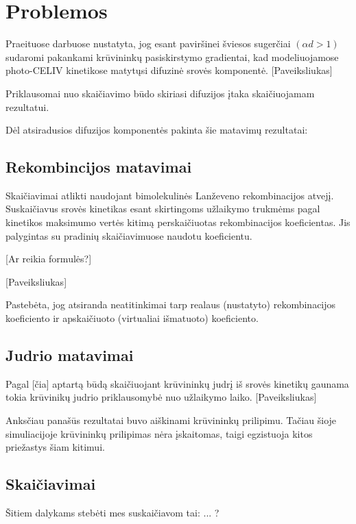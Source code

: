 \section{Problemos}

Praeituose darbuose nustatyta, jog esant paviršinei šviesos sugerčiai $(\alpha d > 1)$ sudaromi pakankami krūvininkų pasiskirstymo gradientai, kad modeliuojamose photo-CELIV kinetikose matytųsi difuzinė srovės komponentė.
[Paveiksliukas]

Priklausomai nuo skaičiavimo būdo skiriasi difuzijos įtaka skaičiuojamam rezultatui.

Dėl atsiradusios difuzijos komponentės pakinta šie matavimų rezultatai:

\subsection{Rekombincijos matavimai}

Skaičiavimai atlikti naudojant bimolekulinės Lanževeno rekombinacijos atvejį. Suskaičiavus srovės kinetikas esant skirtingoms užlaikymo trukmėms pagal kinetikos maksimumo vertės kitimą perskaičiuotas rekombinacijos koeficientas. Jis palygintas su pradinių skaičiavimuose naudotu koeficientu.

[Ar reikia formulės?]

[Paveiksliukas] 

Pastebėta, jog atsiranda neatitinkimai tarp realaus (nustatyto) rekombinacijos koeficiento ir apskaičiuoto (virtualiai išmatuoto) koeficiento.

\subsection{Judrio matavimai}

Pagal [čia] aptartą būdą skaičiuojant krūvininkų judrį iš srovės kinetikų gaunama tokia krūvinikų judrio priklausomybė nuo užlaikymo laiko.
[Paveiksliukas]

Anksčiau panašūs rezultatai buvo aiškinami krūvininkų prilipimu. Tačiau šioje simuliacijoje krūvininkų prilipimas nėra įskaitomas, taigi egzistuoja kitos priežastys šiam kitimui.

\subsection{Skaičiavimai} 

Šitiem dalykams stebėti mes suskaičiavom tai: ... ?
